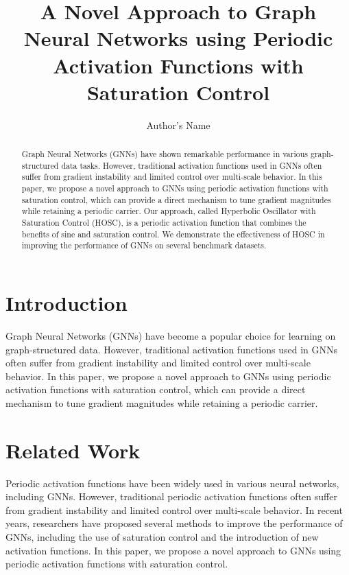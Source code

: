 \documentclass{article}
\begin{document}
        \title{A Novel Approach to Graph Neural Networks using Periodic Activation Functions with Saturation Control}

        \author{Author's Name}

        \maketitle

        \begin{abstract}
        Graph Neural Networks (GNNs) have shown remarkable performance in various graph-structured data tasks. However, traditional activation functions used in GNNs often suffer from gradient instability and limited control over multi-scale behavior. In this paper, we propose a novel approach to GNNs using periodic activation functions with saturation control, which can provide a direct mechanism to tune gradient magnitudes while retaining a periodic carrier. Our approach, called Hyperbolic Oscillator with Saturation Control (HOSC), is a periodic activation function that combines the benefits of sine and saturation control. We demonstrate the effectiveness of HOSC in improving the performance of GNNs on several benchmark datasets.
        \end{abstract}

        \section{Introduction}
        Graph Neural Networks (GNNs) have become a popular choice for learning on graph-structured data. However, traditional activation functions used in GNNs often suffer from gradient instability and limited control over multi-scale behavior. In this paper, we propose a novel approach to GNNs using periodic activation functions with saturation control, which can provide a direct mechanism to tune gradient magnitudes while retaining a periodic carrier.

        \section{Related Work}
        Periodic activation functions have been widely used in various neural networks, including GNNs. However, traditional periodic activation functions often suffer from gradient instability and limited control over multi-scale behavior. In recent years, researchers have proposed several methods to improve the performance of GNNs, including the use of saturation control and the introduction of new activation functions. In this paper, we propose a novel approach to GNNs using periodic activation functions with saturation control.
\end{document}
